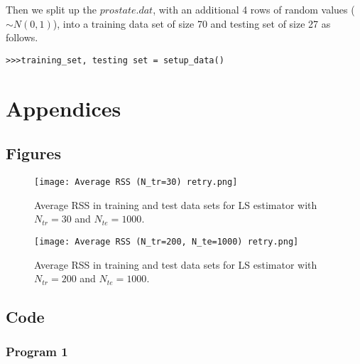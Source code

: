 \documentclass{article}
\begin{document}
Then we split up the $prostate.dat$, with an additional 4 rows of random values ($\sim N(0,1)$), into a training data set of size 70 and testing set of size 27 as follows.
\begin{lstlisting}
>>>training_set, testing set = setup_data()
\end{lstlisting}

\newpage

\section{Appendices}
\vspace{-0.5cm}
\subsection{Figures}


\begin{figure}[h!]
\begin{center}
\texttt{[image: Average RSS (N\_tr=30) retry.png]}
\caption{Average RSS in training and test data sets for LS estimator with $N_{tr}=30$ and $N_{te}=1000$.}
\label{fig:Q2 N30}
\end{center}
\end{figure}

\begin{figure}
\begin{center}
\texttt{[image: Average RSS (N\_tr=200, N\_te=1000) retry.png]}
\caption{Average RSS in training and test data sets for LS estimator with $N_{tr}=200$ and $N_{te}=1000$.}
\label{fig:Q2 N200}
\end{center}
\end{figure}

\newpage

\subsection{Code}
\vspace{-0.5cm}
\subsubsection{Program 1}
\vspace{-0.5cm}
\label{subsec:Program 1} 
\end{document}
